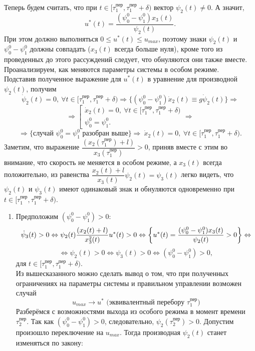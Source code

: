 \documentclass[a4paper,12pt]{article}
\begin{document}
\begin{itemize}
\begin{enumerate}
\begin{enumerate}
Теперь будем считать, что при $t \in [\tau_1^{\text{пер}}, \tau_1^{\text{пер}} + \delta)$ вектор $\psi_2(t) \neq 0.$ А значит,
$$ u^*(t) = \dfrac{(\psi_0^0 - \psi_1^0)x_3(t)}{\psi_2(t)}.$$
При этом должно выполняться $ 0 \leqslant u^*(t) \leqslant u_{max}$, поэтому знаки $\psi_2(t)$ и $\psi_0^0 - \psi_1^0$ должны совпадать ($x_3(t)$ всегда больше нуля), кроме того из проведенных до этого рассуждений следует, что обнуляются они также вместе.\\
Проанализируем, как меняются параметры системы в особом режиме. \\
Подставив полученное выражение для $u^*(t)$ в уравнение для производной $\psi_2(t)$, получим
\[\dot{\psi}_2(t) = 0, \ \forall t \in [\tau_1^{\text{пер
}}, \tau_1^{\text{пер}} + \delta) \Rightarrow \{ \left(\psi_{0}^0 - \psi_{1}^0\right)\dot{x}_2(t) \equiv g\dot{\psi}_2(t) \} \Rightarrow \]
$$\Rightarrow \left[ \begin{gathered}
\dot{x}_2(t) = 0, \ \forall t \in [\tau_1^{\text{пер}}, \tau_1^{\text{пер}} + \delta) \\
\psi_{0}^0 = \psi_{1}^0.
\end{gathered} \right. \Rightarrow $$ 
\[ \Rightarrow \{\text{случай $\psi_{0}^0 = \psi_{1}^0$ разобран выше} \} \Rightarrow \ \dot{x}_2(t) = 0, \ \forall t \in [\tau_1^{\text{пер}}, \tau_1^{\text{пер}} + \delta).\]
Заметим, что выражение $\dfrac{(x_2(\tau_1^{\text{пер}}) + l)}{x_3(\tau_1^{\text{пер}})}  >0$, приняв вместе с этим во внимание, что скорость не меняется в особом режиме, а $x_3(t)$ всегда положительно, из равенства $\dfrac{x_2(t) + l}{x_3(t)}\psi_2(t) = \psi_3(t)$ легко видеть, что $\psi_2(t)$ и $\psi_3(t)$ имеют одинаковый знак и обнуляются одновременно при $t \in [\tau_1^{\text{пер}}, \tau_1^{\text{пер}} + \delta)$. 
\begin{enumerate}
\item Предположим $(\psi_0^0 - \psi_1^0) > 0$:
\[ \dot{\psi}_3(t) > 0 \Leftrightarrow \psi_2(t) \dfrac{(x_2(t) + l)}{x_3^2(t)} u^*(t) > 0 \Leftrightarrow \bigg{\{} u^*(t) = \dfrac{(\psi_0^0 - \psi_1^0)x_3(t)}{\psi_2(t)} > 0 \bigg{\}} \Leftrightarrow \]
\[ \Leftrightarrow \psi_2(t) > 0 \Leftrightarrow \psi_3(t) > 0 \Leftrightarrow (\psi_0^0 - \psi_1^0) > 0,\]
для $t \in [\tau_1^{\text{пер}}, \tau_1^{\text{пер}} + \delta).$ \\ 
Из вышесказанного можно сделать вывод о том, что при полученных ограничениях на параметры системы и правильном управлении возможен случай $$\boxed{u_{max} \rightarrow u^* \text{ (эквивалентный перебору } \tau_1^{\text{пер}})}$$ 
Разберёмся с возможностями выхода из особого режима в момент времени $\tau_2^{\text{пер}}$. Так как $(\psi_0^0 - \psi_1^0) > 0$, следовательно, $\psi_2(\tau_2^{\text{пер}}) > 0$. Допустим произошло переключение на $u_{max}$. Тогда производная $\psi_2(t)$ станет изменяться по закону: 

\end{enumerate}
\end{enumerate}
\end{enumerate}
\end{itemize}
\end{document}
